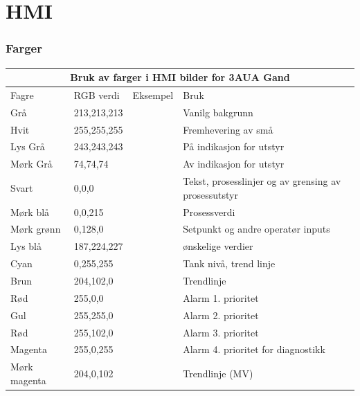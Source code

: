 
\section{HMI}

\subsubsection{Farger}
\begin{center}
\begin{tabular}{ | m{2.2cm} | m{2cm} |m{1.8cm} |m{5cm} |} 
\hline
	\multicolumn{4}{|c|}{\textbf{\cellcolor[HTML]{D5D5D5}Bruk av farger i HMI bilder for 3AUA Gand}} \\
\hline
	Fagre	&RGB verdi&Eksempel&Bruk\\
\hline
	Grå &213,213,213&{\cellcolor[HTML]{D5D5D5}}&Vanilg bakgrunn\\
\hline
	Hvit &255,255,255&{\cellcolor[HTML]{FFFFFF}}&Fremhevering av små\\
\hline
	Lys Grå &243,243,243&{\cellcolor[HTML]{F3F3F3}}&På indikasjon for utstyr\\
\hline
	Mørk Grå &74,74,74&{\cellcolor[HTML]{4A4A4A}}&Av indikasjon for utstyr\\
\hline
	Svart &0,0,0&{\cellcolor[HTML]{000000}}&\tiny Tekst, prosesslinjer og av grensing av prosessutstyr\normalsize\\
\hline
	Mørk blå &0,0,215&{\cellcolor[HTML]{0000D7}}&Prosessverdi\\
\hline
	Mørk grønn &0,128,0&{\cellcolor[HTML]{008000}}&\small Setpunkt og andre operatør inputs\normalsize\\
\hline
	Lys blå &187,224,227&{\cellcolor[HTML]{BBE0E3}}&ønskelige verdier\\
\hline
	Cyan &0,255,255&{\cellcolor[HTML]{00FFFF}}&Tank nivå, trend linje\\
\hline
	Brun &204,102,0&{\cellcolor[HTML]{CC6600}}&Trendlinje\\
\hline
	Rød &255,0,0&{\cellcolor[HTML]{FF0000}}&Alarm 1. prioritet\\
\hline
	Gul &255,255,0&{\cellcolor[HTML]{FFFF00}}&Alarm 2. prioritet\\
\hline
	Rød &255,102,0&{\cellcolor[HTML]{FF6600}}&Alarm 3. prioritet\\
\hline
	Magenta&255,0,255&{\cellcolor[HTML]{FF00FF}}&\small Alarm 4. prioritet for diagnostikk\\
\hline
	\small Mørk magenta&204,0,102&{\cellcolor[HTML]{E00066}}&\normalsize Trendlinje (MV)\\

\hline
\end{tabular}
\end{center}
